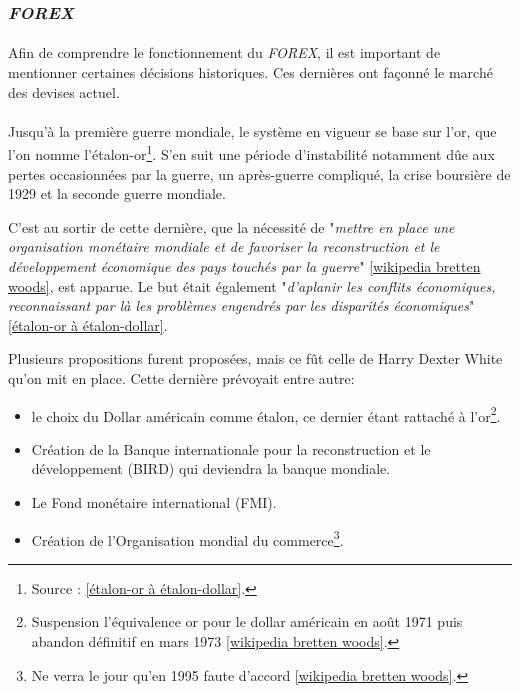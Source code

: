 \documentclass[a4paper, 11pt]{article}
\begin{document}
\subsubsection{\textit{FOREX}}

\paragraph{}Afin de comprendre le fonctionnement du \textit{FOREX}, il est important de mentionner certaines décisions historiques. Ces dernières ont façonné le marché des devises actuel.

\paragraph{}
Jusqu'à la première guerre mondiale, le système en vigueur se base sur l'or, que l'on nomme l'étalon-or\footnote{Source : \ref{étalon-or à étalon-dollar}.}. S'en suit une période d'instabilité notamment dûe aux pertes occasionnées par la guerre, un après-guerre compliqué, la crise boursière de 1929 et la seconde guerre mondiale.

C'est au sortir de cette dernière, que la nécessité de "\textit{mettre en place une organisation monétaire mondiale et de favoriser la reconstruction et le développement économique des pays touchés par la guerre}" \ref{wikipedia bretten woods}, est apparue. Le but était également "\textit{d’aplanir les conflits économiques, reconnaissant par là les problèmes engendrés par les disparités économiques}" \ref{étalon-or à étalon-dollar}.

Plusieurs propositions furent proposées, mais ce fût celle de Harry Dexter White qu'on mit en place. Cette dernière prévoyait entre autre:
\begin{itemize}
\item le choix du Dollar américain comme étalon, ce dernier étant rattaché à l'or\footnote{Suspension l'équivalence or pour le dollar américain en août 1971 puis abandon définitif en mars 1973 \ref{wikipedia bretten woods}.}.
\item Création de la Banque internationale pour la reconstruction et le développement (BIRD) qui deviendra la banque mondiale.
\item Le Fond monétaire international (FMI).
\item Création de l'Organisation mondial du commerce\footnote{Ne verra le jour qu'en 1995 faute d'accord \ref{wikipedia bretten woods}.}.
\end{itemize}
\end{document}
